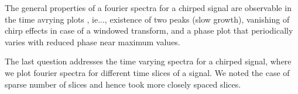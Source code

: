 \documentclass{article}
\begin{document}
The general properties of a fourier spectra for a chirped signal are observable in the time avrying plots , ie..., existence of two peaks (slow growth), vanishing of chirp effects in case of a windowed transform, and a phase plot that periodically varies with reduced phase near maximum values.

The last question addresses the time varying spectra for a chirped signal, where we plot fourier spectra for different time slices of a signal. We noted the case of sparse number of slices and hence took more closely spaced slices.
\end{document}
